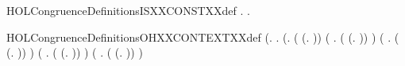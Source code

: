 \newcommand{\HOLCongruenceDefinitionsGSEQXXdef}{\UseVerbatim{HOLCongruenceDefinitionsGSEQXXdef}}
\begin{SaveVerbatim}{HOLCongruenceDefinitionsISXXCONSTXXdef}
\HOLTokenTurnstile{} \HOLSymConst{\HOLTokenForall{}}.   \HOLSymConst{\HOLTokenEquiv{}} \HOLSymConst{\HOLTokenForall{}} .   \HOLSymConst{=}  
\end{SaveVerbatim}
\newcommand{\HOLCongruenceDefinitionsISXXCONSTXXdef}{\UseVerbatim{HOLCongruenceDefinitionsISXXCONSTXXdef}}
\begin{SaveVerbatim}{HOLCongruenceDefinitionsOHXXCONTEXTXXdef}
\HOLTokenTurnstile{}  \HOLSymConst{=}
   (\HOLTokenLambda{}.
        \HOLSymConst{\HOLTokenForall{}}.
            (\HOLSymConst{\HOLTokenForall{}}.
                 ( \HOLSymConst{=} (\HOLTokenLambda{}. )) \HOLSymConst{\HOLTokenDisj{}}
                 (\HOLSymConst{\HOLTokenExists{}} . ( \HOLSymConst{=} (\HOLTokenLambda{}.  )) \HOLSymConst{\HOLTokenConj{}}  ) \HOLSymConst{\HOLTokenDisj{}}
                 (\HOLSymConst{\HOLTokenExists{}} . ( \HOLSymConst{=} (\HOLTokenLambda{}.   \HOLSymConst{\ensuremath{+}} )) \HOLSymConst{\HOLTokenConj{}}  ) \HOLSymConst{\HOLTokenDisj{}}
                 (\HOLSymConst{\HOLTokenExists{}} . ( \HOLSymConst{=} (\HOLTokenLambda{}.  \HOLSymConst{\ensuremath{+}}  )) \HOLSymConst{\HOLTokenConj{}}  ) \HOLSymConst{\HOLTokenDisj{}}
                 (\HOLSymConst{\HOLTokenExists{}} . ( \HOLSymConst{=} (\HOLTokenLambda{}.   \HOLSymConst{\ensuremath{\parallel}} )) \HOLSymConst{\HOLTokenConj{}}  ) \HOLSymConst{\HOLTokenDisj{}}

\end{SaveVerbatim}

